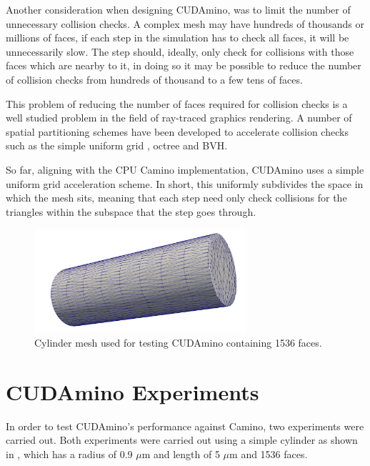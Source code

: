 Another consideration when designing CUDAmino, was to limit the number of unnecessary collision checks.
A complex mesh may have hundreds of thousands or millions of faces, if each step in the simulation has to check all faces, it will be unnecessarily slow.
The step should, ideally, only check for collisions with those faces which are nearby to it, in doing so it may be possible to reduce the number of collision checks from hundreds of thousand to a few tens of faces.

This problem of reducing the number of faces required for collision checks is a well studied problem in the field of ray-traced graphics rendering.
A number of spatial partitioning schemes have been developed to accelerate collision checks  such as the simple uniform grid \cite{Fujimoto1986,Amanatides1987}, octree \cite{Fujimoto1986} and \ac{BVH}\cite{Kay1986}. 

So far, aligning with the \ac{CPU} Camino implementation, CUDAmino uses a simple uniform grid acceleration scheme. In short, this uniformly subdivides the space in which the mesh sits, meaning that each step need only check collisions for the triangles within the subspace that the step goes through.

\begin{figure}[t]
  \centering
  \includegraphics[width=0.7\textwidth]{figures/cudamino/cylinder.png}
  \caption{Cylinder mesh used for testing CUDAmino containing 1536 faces.}
  \label{fig:cudamino_cyl}
\end{figure}

\section{CUDAmino Experiments}
In order to test CUDAmino's performance against Camino, two experiments were carried out.
Both experiments were carried out using a simple cylinder as shown in , which has a radius of 0.9 $\mu$m and length of 5 $\mu$m and 1536 faces.

